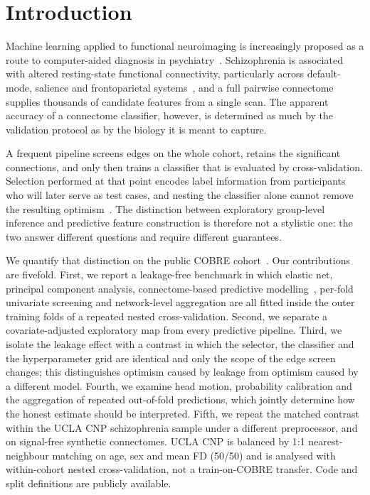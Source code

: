 \documentclass[runningheads]{llncs}
\begin{document}
\section{Introduction}

Machine learning applied to functional neuroimaging is increasingly proposed as a route
to computer-aided diagnosis in psychiatry~\cite{Arbabshirani2017,Wolfers2015}.
Schizophrenia is associated with altered resting-state functional connectivity,
particularly across default-mode, salience and frontoparietal
systems~\cite{Fornito2015,Menon2011,Woodward2015}, and a full pairwise connectome
supplies thousands of candidate features from a single scan. The apparent accuracy of a
connectome classifier, however, is determined as much by the validation protocol as by
the biology it is meant to capture.

A frequent pipeline screens edges on the whole cohort, retains the significant
connections, and only then trains a classifier that is evaluated by cross-validation.
Selection performed at that point encodes label information from participants who will
later serve as test cases, and nesting the classifier alone cannot remove the resulting
optimism~\cite{Arbabshirani2017,Varoquaux2017}. The distinction between exploratory
group-level inference and predictive feature construction is therefore not a stylistic
one: the two answer different questions and require different guarantees.

We quantify that distinction on the public COBRE cohort~\cite{Aine2017}.
Our contributions are fivefold. First, we report a leakage-free benchmark in which
elastic net, principal component analysis, connectome-based predictive
modelling~\cite{Shen2017}, per-fold univariate screening and network-level aggregation
are all fitted inside the outer training folds of a repeated nested cross-validation.
Second, we separate a covariate-adjusted exploratory map from every predictive pipeline.
Third, we isolate the leakage effect with a contrast in which the selector, the
classifier and the hyperparameter grid are identical and only the scope of the edge
screen changes; this distinguishes optimism caused by leakage from optimism caused by a
different model. Fourth, we examine head motion, probability calibration and the
aggregation of repeated out-of-fold predictions, which jointly determine how the honest
estimate should be interpreted. Fifth, we repeat the matched contrast within the UCLA CNP
schizophrenia sample under a different preprocessor, and on signal-free synthetic
connectomes. UCLA CNP is balanced by 1:1 nearest-neighbour matching on age, sex and mean
FD (50/50) and is analysed with within-cohort nested cross-validation, not a
train-on-COBRE transfer. Code and split definitions are publicly available.
\end{document}
